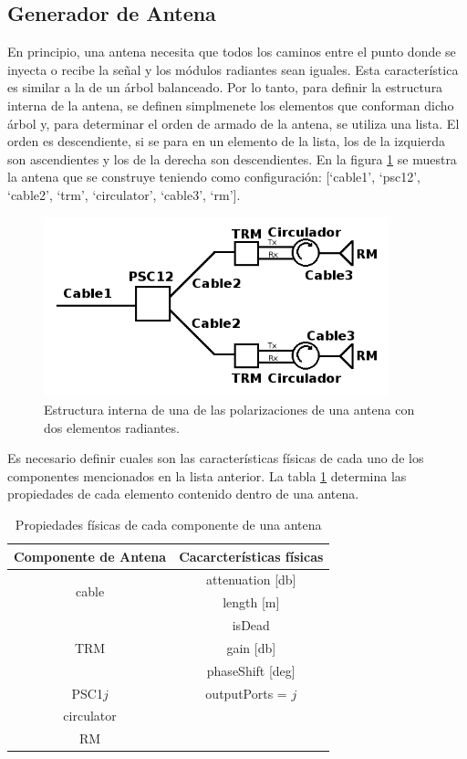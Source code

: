 \subsection{Generador de Antena}

En principio, una antena necesita que todos los caminos entre el punto donde se inyecta o recibe la se\~nal y los m\'odulos 
radiantes sean iguales. Esta caracter\'istica es similar a la de un \'arbol balanceado. Por lo tanto, para definir la 
estructura interna de la antena, se definen simplmenete los elementos que conforman dicho \'arbol y, para determinar el orden 
de armado de la antena, se utiliza una lista. El orden es descendiente, si se para en un elemento de la lista, los de la 
izquierda son ascendientes y los de la derecha son descendientes. En la figura \ref{fig:2RMAntenna} se muestra la antena que 
se construye teniendo como configuración: [\enquote*{cable1}, \enquote*{psc12}, \enquote*{cable2}, \enquote*{trm}, 
\enquote*{circulator}, \enquote*{cable3}, \enquote*{rm}].

\begin{figure}
 \centering
 \includegraphics[width=10cm]{gfx/RFDN.png}
 \caption{Estructura interna de una de las polarizaciones de una antena con dos elementos radiantes.}
 \label{fig:2RMAntenna}
\end{figure}

Es necesario definir cuales son las características físicas de cada uno de los componentes mencionados en la lista anterior. 
La tabla \ref{tab:propertiesOfComponents} determina las propiedades de cada elemento contenido dentro de una antena. 

\begin{table}[H]
  \footnotesize
  \centering
  \begin{tabular}{|c|c|}
	\hline
	\textbf{Componente de Antena} & \textbf{Cacarcterísticas físicas} \tabularnewline \hline 
	\multirow{2}{*}{cable} &  attenuation [db] \tabularnewline \cline{2-2}
	 & length [m] \tabularnewline \hline 
	\multirow{3}{*}{TRM} & isDead \tabularnewline \cline{2-2}
	 & gain [db]\tabularnewline \cline{2-2}
	 & phaseShift [deg] \tabularnewline \hline 
	PSC1$j$ & outputPorts = $j$ \tabularnewline \hline 
	circulator & \tabularnewline \hline 
	RM & \tabularnewline \hline 
  \end{tabular}
  \caption{Propiedades físicas de cada componente de una antena}
  \label{tab:propertiesOfComponents}
\end{table}


